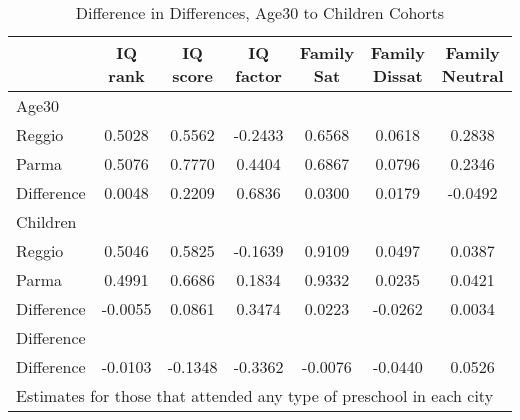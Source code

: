 \begin{table}[htbp]\centering
\caption{Difference in Differences, Age30 to Children Cohorts}
\begin{tabular}{l*{6}{c}}
\hline\hline
            &     IQ rank&    IQ score&   IQ factor&  Family Sat&Family Dissat&Family Neutral\\
\hline
Age30       &            &            &            &            &            &            \\
Reggio      &      0.5028&      0.5562&     -0.2433&      0.6568&      0.0618&      0.2838\\
Parma       &      0.5076&      0.7770&      0.4404&      0.6867&      0.0796&      0.2346\\
Difference  &      0.0048&      0.2209&      0.6836&      0.0300&      0.0179&     -0.0492\\
\hline
Children    &            &            &            &            &            &            \\
Reggio      &      0.5046&      0.5825&     -0.1639&      0.9109&      0.0497&      0.0387\\
Parma       &      0.4991&      0.6686&      0.1834&      0.9332&      0.0235&      0.0421\\
Difference  &     -0.0055&      0.0861&      0.3474&      0.0223&     -0.0262&      0.0034\\
\hline
Difference  &            &            &            &            &            &            \\
Difference  &     -0.0103&     -0.1348&     -0.3362&     -0.0076&     -0.0440&      0.0526\\
\hline\hline
\multicolumn{7}{l}{\footnotesize Estimates for those that attended any type of preschool in each city}\\
\end{tabular}
\end{table}
